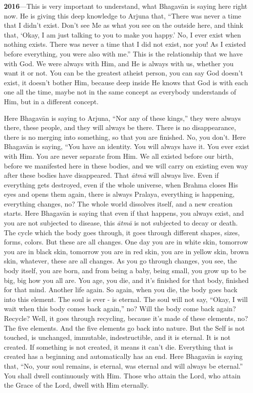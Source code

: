 \textbf{2016}---This is very important to understand, what Bhagavān is saying here right now. He is giving this deep knowledge to Arjuna that, “There was never a time that I didn’t exist. Don’t see Me as what you see on the outside here, and think that, ‘Okay, I am just talking to you to make you happy.’ No, I ever exist when nothing exists. There was never a time that I did not exist, nor you! As I existed before everything, you were also with me.” This is the relationship that we have with God. We were always with Him, and He is always with us, whether you want it or not. You can be the greatest atheist person, you can say God doesn’t exist, it doesn’t bother Him, because deep inside He knows that God is with each one all the time, maybe not in the same concept as everybody understands of Him, but in a different concept.

Here Bhagavān is saying to Arjuna, “Nor any of these kings,” they were always there, these people, and they will always be there. There is no disappearance, there is no merging into something, so that you are finished. No, you don’t. Here Bhagavān is saying, “You have an identity. You will always have it. You ever exist with Him. You are never separate from Him. We all existed before our birth, before we manifested here in these bodies, and we will carry on existing even way after these bodies have disappeared. That \textit{ātmā} will always live. Even if everything gets destroyed, even if the whole universe, when Brahma closes His eyes and opens them again, there is always Pralaya, everything is happening, everything changes, no? The whole world dissolves itself, and a new creation starts. Here Bhagavān is saying that even if that happens, you always exist, and you are not subjected to disease, this \textit{ātmā} is not subjected to decay or death. The cycle which the body goes through, it goes through different shapes, sizes, forms, colors. But these are all changes. One day you are in white skin, tomorrow you are in black skin, tomorrow you are in red skin, you are in yellow skin, brown skin, whatever, these are all changes. As you go through changes, you see, the body itself, you are born, and from being a baby, being small, you grow up to be big, big how you all are. You age, you die, and it's finished for that body, finished for that mind. Another life again. So again, when you die, the body goes back into this element. The soul is ever - is eternal. The soul will not say, “Okay, I will wait when this body comes back again,” no? Will the body come back again? Recycle? Well, it goes through recycling, because it’s made of these elements, no? The five elements. And the five elements go back into nature. But the Self is not touched, is unchanged, immutable, indestructible, and it is eternal. It is not created. If something is not created, it means it can’t die. Everything that is created has a beginning and automatically has an end. Here Bhagavān is saying that, “No, your soul remains, is eternal, was eternal and will always be eternal.” You shall dwell continuously with Him. Those who attain the Lord, who attain the Grace of the Lord, dwell with Him eternally.

